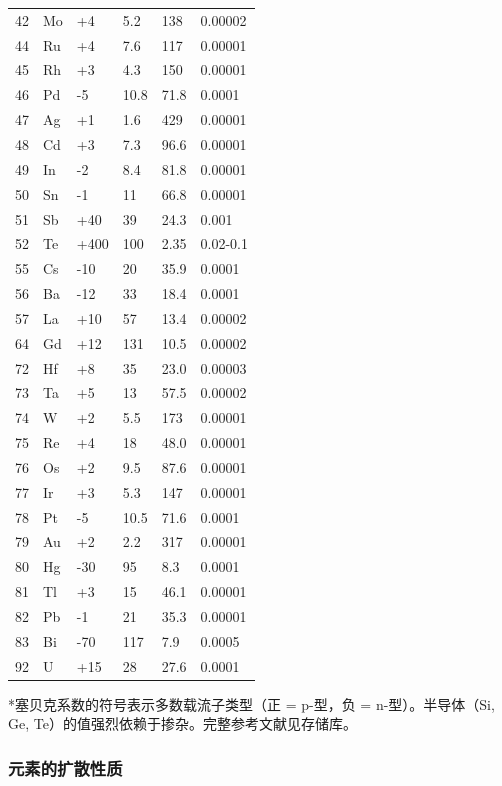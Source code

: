 \documentclass[12pt,a4paper]{article}
\begin{document}
\begin{longtable}{p{0.8cm}p{1.2cm}p{2.2cm}p{2.2cm}p{2.2cm}p{2.2cm}}
		42 & Mo & +4 & 5.2 & 138 & 0.00002 \\
		44 & Ru & +4 & 7.6 & 117 & 0.00001 \\
		45 & Rh & +3 & 4.3 & 150 & 0.00001 \\
		46 & Pd & -5 & 10.8 & 71.8 & 0.0001 \\
		47 & Ag & +1 & 1.6 & 429 & 0.00001 \\
		48 & Cd & +3 & 7.3 & 96.6 & 0.00001 \\
		49 & In & -2 & 8.4 & 81.8 & 0.00001 \\
		50 & Sn & -1 & 11 & 66.8 & 0.00001 \\
		51 & Sb & +40 & 39 & 24.3 & 0.001 \\
		52 & Te & +400 & 100 & 2.35 & 0.02-0.1 \\
		55 & Cs & -10 & 20 & 35.9 & 0.0001 \\
		56 & Ba & -12 & 33 & 18.4 & 0.0001 \\
		57 & La & +10 & 57 & 13.4 & 0.00002 \\
		64 & Gd & +12 & 131 & 10.5 & 0.00002 \\
		72 & Hf & +8 & 35 & 23.0 & 0.00003 \\
		73 & Ta & +5 & 13 & 57.5 & 0.00002 \\
		74 & W  & +2 & 5.5 & 173 & 0.00001 \\
		75 & Re & +4 & 18 & 48.0 & 0.00001 \\
		76 & Os & +2 & 9.5 & 87.6 & 0.00001 \\
		77 & Ir & +3 & 5.3 & 147 & 0.00001 \\
		78 & Pt & -5 & 10.5 & 71.6 & 0.0001 \\
		79 & Au & +2 & 2.2 & 317 & 0.00001 \\
		80 & Hg & -30 & 95 & 8.3 & 0.0001 \\
		81 & Tl & +3 & 15 & 46.1 & 0.00001 \\
		82 & Pb & -1 & 21 & 35.3 & 0.00001 \\
		83 & Bi & -70 & 117 & 7.9 & 0.0005 \\
		92 & U  & +15 & 28 & 27.6 & 0.0001 \\
		\bottomrule
	\end{longtable}
	*塞贝克系数的符号表示多数载流子类型（正 = p-型，负 = n-型）。半导体（Si, Ge, Te）的值强烈依赖于掺杂。完整参考文献见存储库。
	
	\subsubsection{元素的扩散性质}
	\label{subsec:diffusion-properties-func}
	
\end{document}
